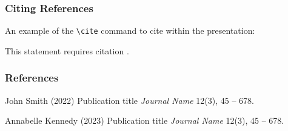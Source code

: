 \documentclass[
	11pt, %
]{beamer}
\begin{document}
\begin{frame}
	\frametitle{Citing References}
	
	An example of the \texttt{\textbackslash cite} command to cite within the presentation:
	
	\bigskip %
	
	This statement requires citation \cite{p1,p2}.
\end{frame}


\begin{frame} %
	\frametitle{References}
	
	\begin{thebibliography}{99} %
		\footnotesize %
		
			John Smith (2022)
			\newblock Publication title
			\newblock \emph{Journal Name} 12(3), 45 -- 678.
			
			Annabelle Kennedy (2023)
			\newblock Publication title
			\newblock \emph{Journal Name} 12(3), 45 -- 678.
	\end{thebibliography}
\end{frame}

\end{document}
